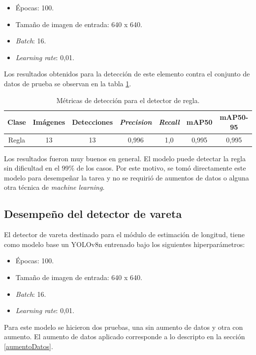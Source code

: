\begin{itemize}
	\item Épocas: 100.
    \item Tamaño de imagen de entrada: 640 x 640.
    \item \textit{Batch}: 16.
    \item \textit{Learning rate}: 0,01.
\end{itemize}

Los resultados obtenidos para la detección de este elemento contra el conjunto de datos de prueba se observan en la tabla \ref{tab:resultadosRegla}.

\begin{table}[h]
	\centering
	\caption{Métricas de detección para el detector de regla.}
	\begin{tabular}{c c c c c c c}    
		\toprule
		\textbf{Clase}&\textbf{Imágenes}&\textbf{Detecciones}&\textbf{\textit{Precision}} &\textbf{\textit{Recall}}&\textbf{mAP50}&\textbf{mAP50-95}\\
		\midrule
		Regla & 13 & 13 & 0,996 & 1,0 & 0,995 & 0,995\\		
		\bottomrule
		\hline
	\end{tabular}
	\label{tab:resultadosRegla}
\end{table}

Los resultados fueron muy buenos en general. El modelo puede detectar la regla sin dificultad en el 99\% de los casos. Por este motivo, se tomó directamente este modelo para desempeñar la tarea y no se requirió de aumentos de datos o alguna otra técnica de \textit{machine learning}.

\subsection{Desempeño del detector de vareta}

El detector de vareta destinado para el módulo de estimación de longitud, tiene como modelo base un YOLOv8n entrenado bajo los siguientes hiperparámetros:

\begin{itemize}
	\item Épocas: 100.
    \item Tamaño de imagen de entrada: 640 x 640.
    \item \textit{Batch}: 16.
    \item \textit{Learning rate}: 0,01.
\end{itemize}

Para este modelo se hicieron dos pruebas, una sin aumento de datos y otra con aumento. El aumento de datos aplicado corresponde a lo descripto en la sección \ref{aumentoDatos}.

